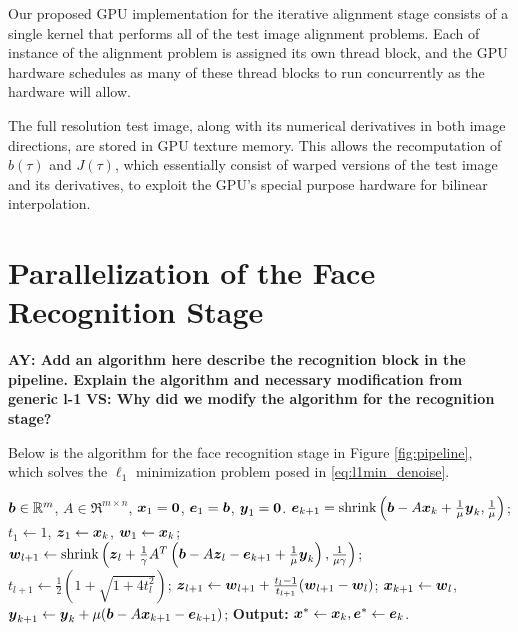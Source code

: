 \documentclass[10pt,twocolumn,letterpaper]{article}
\begin{document}
Our proposed GPU implementation for the iterative alignment stage consists of a
single kernel that performs all of the test image alignment problems.  Each of
instance of the alignment problem is assigned its own thread block, and the GPU
hardware schedules as many of these thread blocks to run concurrently as the 
hardware will allow.  

The full resolution test image, along with its numerical derivatives in both
image directions, are stored in GPU texture memory. This  allows the
recomputation of $b(\tau)$ and $J(\tau)$, which essentially consist of warped
versions of the test image and its derivatives, to exploit the GPU's special
purpose hardware for bilinear interpolation.


\section{Parallelization of the Face Recognition Stage}
\label{sec:recognition}
{\bf AY: Add an algorithm here describe the recognition block in the pipeline. Explain the algorithm and necessary modification from generic l-1}
{\bf VS: Why did we modify the algorithm for the recognition stage? }

Below is the algorithm for the face recognition stage in Figure \ref{fig:pipeline}, which
solves the $\ell_1$ minimization problem posed in \eqref{eq:l1min_denoise}. 

\begin{algorithm}[t]
\caption{\bf (Face Recognition via ALM)}
\begin{algorithmic}[1]
\begin{small}
 ${\boldsymbol{b}} \in {\mathbb{R}}^m$, $A \in \Re^{m \times n}$,
${\boldsymbol{x}}_1 = \boldsymbol{0}$, $\boldsymbol{e}_1 = {\boldsymbol{b}}$, $\boldsymbol{y}_1 =
\boldsymbol{0}$.
\STATE $\boldsymbol{e}_{k+1} = \textup{shrink}\left({\boldsymbol{b}} - A{\boldsymbol{x}}_k +
\frac{1}{\mu}\boldsymbol{y}_k, \frac{1}{\mu}\right)$;
\STATE $t_1\leftarrow 1$, $\boldsymbol{z}_1 \leftarrow {\boldsymbol{x}}_k$, $\boldsymbol{w}_1 \leftarrow {\boldsymbol{x}}_k$;
\STATE $\boldsymbol{w}_{l+1} \leftarrow \textup{shrink}\left(\boldsymbol{z}_l +
\frac{1}{\gamma}A^T\left({\boldsymbol{b}} - A\boldsymbol{z}_l - \boldsymbol{e}_{k+1} +
\frac{1}{\mu}\boldsymbol{y}_k\right), \frac{1}{\mu\gamma}\right)$;
\STATE $t_{l+1} \leftarrow \frac{1}{2}\left( 1 +
\sqrt{1+4t_l^2}\right)$;
\STATE $\boldsymbol{z}_{l+1} \leftarrow \boldsymbol{w}_{l+1} + \frac{t_l - 1}{t_{l+1}}(\boldsymbol{w}_{l+1} - \boldsymbol{w}_l)$;
\ENDWHILE
\STATE ${\boldsymbol{x}}_{k+1} \leftarrow \boldsymbol{w}_{l}$,  \; $\boldsymbol{y}_{k+1} \leftarrow \boldsymbol{y}_k + \mu ({\boldsymbol{b}} - A{\boldsymbol{x}}_{k+1} - \boldsymbol{e}_{k+1})$;
\ENDWHILE \STATE
{\bf Output:} ${\boldsymbol{x}}^* \leftarrow {\boldsymbol{x}}_k, \boldsymbol{e}^* \leftarrow \boldsymbol{e}_k$.
\end{small}
\end{algorithmic}
\label{alg:alm_rec} 
\end{algorithm}
\end{document}
